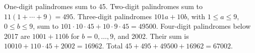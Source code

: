 One-digit palindromes sum to 45. Two-digit palindromes sum to $11(1+\cdots+9)=495$. Three-digit palindromes $101a+10b$, with $1\le a\le9$, $0\le b\le9$, sum to $101\cdot10\cdot45+10\cdot9\cdot45=49500$. Four-digit palindromes below 2017 are $1001+110b$ for $b=0,\ldots,9$, and 2002. Their sum is $10010+110\cdot45+2002=16962$. Total $45+495+49500+16962=\boxed{67002}$.
